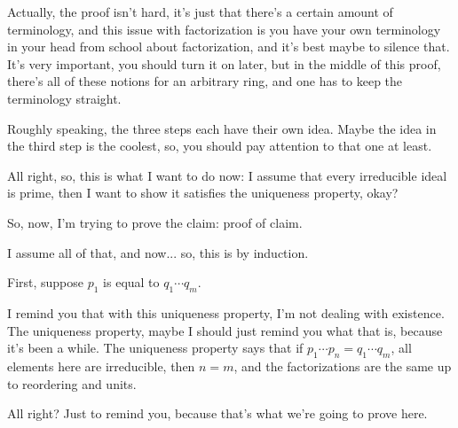 \begin{speech}[00:33:39 - 00:36:03]
Actually, the proof isn't hard, it's just that there's a certain amount of terminology, and this issue with factorization is you have your own terminology in your head from school about factorization, and it's best maybe to silence that. It's very important, you should turn it on later, but in the middle of this proof, there's all of these notions for an arbitrary ring, and one has to keep the terminology straight.

Roughly speaking, the three steps each have their own idea. Maybe the idea in the third step is the coolest, so, you should pay attention to that one at least. 

All right, so, this is what I want to do now: I assume that every irreducible ideal is prime, then I want to show it satisfies the uniqueness property, okay?

So, now, I'm trying to prove the claim: proof of claim. 

I assume all of that, and now... so, this is by induction.

First, suppose $p_1$ is equal to $q_1 \cdots q_m$. 

I remind you that with this uniqueness property, I'm not dealing with existence. The uniqueness property, maybe I should just remind you what that is, because it's been a while. The uniqueness property says that if $p_1 \cdots p_n = q_1 \cdots q_m$,  all elements here are irreducible,  then $n = m$,  and the factorizations  are the same  up to reordering  and units. 

All right? Just to remind you, because that's what we're going to prove here.
\end{speech}

\begin{content}
\end{content}

